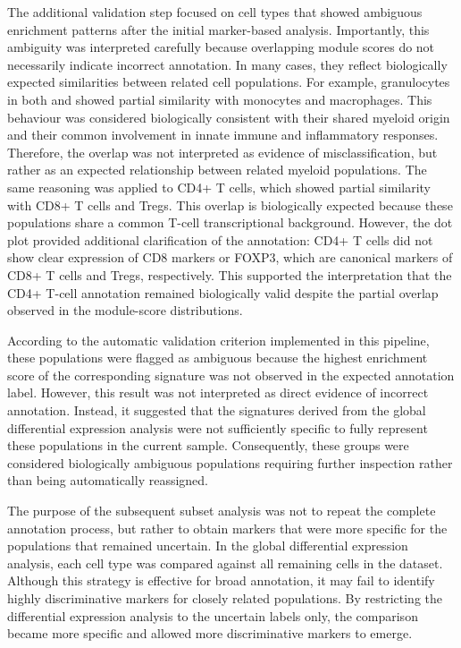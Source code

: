 The additional validation step focused on cell types that showed ambiguous enrichment patterns after the initial marker-based analysis. Importantly, this ambiguity was interpreted carefully because overlapping module scores do not necessarily indicate incorrect annotation. In many cases, they reflect biologically expected similarities between related cell populations. For example, granulocytes in both  and  showed partial similarity with monocytes and macrophages. This behaviour was considered biologically consistent with their shared myeloid origin and their common involvement in innate immune and inflammatory responses. Therefore, the overlap was not interpreted as evidence of misclassification, but rather as an expected relationship between related myeloid populations. The same reasoning was applied to CD4+ T cells, which showed partial similarity with CD8+ T cells and Tregs. This overlap is biologically expected because these populations share a common T-cell transcriptional background. However, the dot plot provided additional clarification of the annotation: CD4+ T cells did not show clear expression of CD8 markers or FOXP3, which are canonical markers of CD8+ T cells and Tregs, respectively. This supported the interpretation that the CD4+ T-cell annotation remained biologically valid despite the partial overlap observed in the module-score distributions. 

According to the automatic validation criterion implemented in this pipeline, these populations were flagged as ambiguous because the highest enrichment score of the corresponding signature was not observed in the expected annotation label. However, this result was not interpreted as direct evidence of incorrect annotation. Instead, it suggested that the signatures derived from the global differential expression analysis were not sufficiently specific to fully represent these populations in the current sample. Consequently, these groups were considered biologically ambiguous populations requiring further inspection rather than being automatically reassigned.


The purpose of the subsequent subset analysis was not to repeat the complete annotation process, but rather to obtain markers that were more specific for the populations that remained uncertain. In the global differential expression analysis, each cell type was compared against all remaining cells in the dataset. Although this strategy is effective for broad annotation, it may fail to identify highly discriminative markers for closely related populations. By restricting the differential expression analysis to the uncertain labels only, the comparison became more specific and allowed more discriminative markers to emerge.

